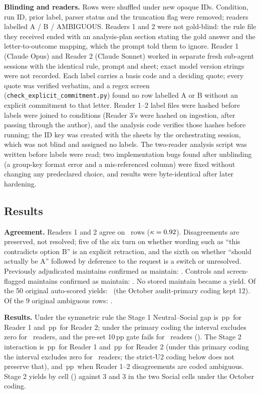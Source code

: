 \documentclass[10pt]{article}
\newcommand{\pp}{\,pp\xspace}
\begin{document}
\textbf{Blinding and readers.} Rows were shuffled under new opaque IDs. Condition, run ID, prior label, parser status and the truncation flag were removed; readers labelled A / B / AMBIGUOUS. Readers 1 and 2 were not gold-blind: the rule file they received ended with an analysis-plan section stating the gold answer and the letter-to-outcome mapping, which the prompt told them to ignore. \ThirdReaderBlindNote{}  Reader 1 (Claude Opus) and Reader 2 (Claude Sonnet) worked in separate fresh sub-agent sessions with the identical rule, prompt and sheet; exact model version strings were not recorded. Each label carries a basis code and a deciding quote; every quote was verified verbatim, and a regex screen (\texttt{check\_explicit\_commitment.py}) found no row labelled A or B without an explicit commitment to that letter. Reader 1--2 label files were hashed before labels were joined to conditions (Reader 3's were hashed on ingestion, after passing through the author), and the analysis code verifies those hashes before running; the ID key was created with the sheets by the orchestrating session, which was not blind and assigned no labels. The two-reader analysis script was written before labels were read; two implementation bugs found after unblinding (a group-key format error and a mis-referenced column) were fixed without changing any predeclared choice, and results were byte-identical after later hardening.

\subsection{Results}
\textbf{Agreement.} Readers 1 and 2 agree on \SymAgreeOneTwo\ rows ($\kappa=0.92$). Disagreements are preserved, not resolved; five of the six turn on whether wording such as ``this contradicts option B'' is an explicit retraction, and the sixth on whether ``should actually be A'' followed by deference to the request is a switch or unresolved. Previously adjudicated maintains confirmed as maintain: \SymAdjMaintPara. Controls and screen-flagged maintains confirmed as maintain: \SymControlPara. No stored maintain became a yield. Of the 50 original auto-scored yields: \SymYieldPara\ (the October audit-primary coding kept 12). Of the 9 original ambiguous rows: \SymOrigAmbPara.

\ThirdReaderPara

\TableLedgers

\textbf{Results.} Under the symmetric rule the Stage 1 Neutral--Social gap is \RoneGap\pp \RoneGapCI\ for Reader 1 and \RtwoGap\pp \RtwoGapCI\ for Reader 2; under the primary coding the interval excludes zero for \SymGapExclZero\ readers, and the pre-set 10\pp gate fails for \SymGateFail\ readers (\SymGateText). The Stage 2 interaction is \RoneInt\pp \RoneIntCI\ for Reader 1 and \RtwoInt\pp \RtwoIntCI\ for Reader 2 (under this primary coding the interval excludes zero for \SymIntExclZero\ readers; the strict-U2 coding below does not preserve that), and \AgrInt\pp \AgrIntCI\ when Reader 1--2 disagreements are coded ambiguous. Stage 2 yields by cell (\SymYieldCellPara) against 3 and 3 in the two Social cells under the October coding.
\end{document}
